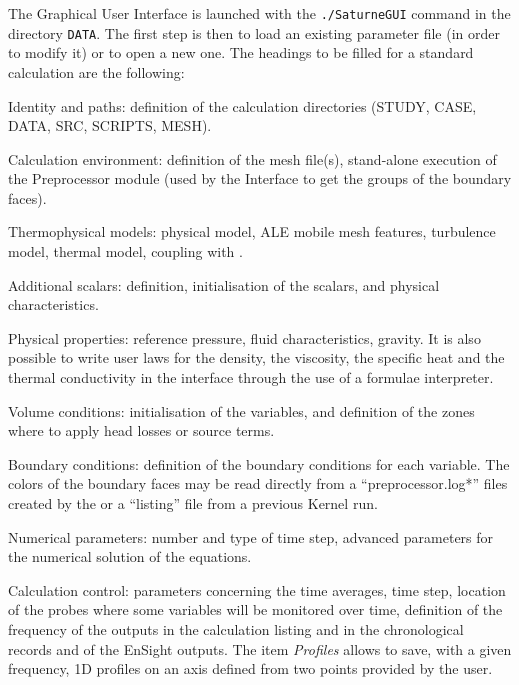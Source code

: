 {{{The Graphical User Interface is launched with the \texttt{./SaturneGUI} command
in the directory \texttt{DATA}. The first step is
then to load an existing parameter file (in order to modify it) or to
open a new one. The headings to be filled for a standard calculation are the
following:

\begin{list}{-}{}
\item Identity and paths: definition of the calculation directories
      (STUDY, CASE, DATA, SRC, SCRIPTS, MESH).

\item Calculation environment: definition of the mesh file(s),
      stand-alone execution of the Preprocessor module
      (used by the Interface to get the groups of the boundary
      faces).

\item Thermophysical models: physical model, ALE mobile mesh features,
      turbulence model, thermal model, coupling with \syrthes.

\item Additional scalars: definition, initialisation of the scalars,
      and physical characteristics.

\item Physical properties: reference pressure, fluid characteristics, gravity.
      It is also possible to write user laws for the density, the viscosity,
      the specific heat and the thermal conductivity in the interface through
      the use of a formulae interpreter.

\item Volume conditions: initialisation of the variables, and definition of
      the zones where to apply head losses or source terms.

\item Boundary conditions: definition of the boundary conditions for
      each variable. The colors of the boundary faces may be read
      directly from a ``preprocessor.log*'' files created by the \pcs
      or a ``listing'' file from a previous Kernel run.

\item Numerical parameters: number and type of time step, advanced parameters
      for the numerical solution of the equations.

\item Calculation control: parameters concerning the time averages, time step,
      location of
      the probes where some variables will be monitored over time,
      definition of the frequency of the outputs in the calculation
      listing and in the chronological records and of the EnSight outputs.
      The item {\itshape Profiles} allows to save, with a  given frequency,
      1D profiles on an axis defined from two points provided by the user.


\end{list}}}}
